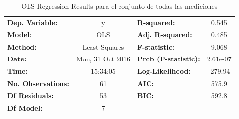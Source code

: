 \documentclass{article}
\begin{document}
\begin {table}

\begin{center}

\caption{OLS Regression Results para el conjunto de todas las mediciones}
\label{tabla:entrenamientoGlobal}

\vspace{0.3in}

\begin{tabular}{lclc}

\toprule
\textbf{Dep. Variable:}    &        y         & \textbf{  R-squared:         } &     0.545   \\
\textbf{Model:}            &       OLS        & \textbf{  Adj. R-squared:    } &     0.485   \\
\textbf{Method:}           &  Least Squares   & \textbf{  F-statistic:       } &     9.068   \\
\textbf{Date:}             & Mon, 31 Oct 2016 & \textbf{  Prob (F-statistic):} &  2.61e-07   \\
\textbf{Time:}             &     15:34:05     & \textbf{  Log-Likelihood:    } &   -279.94   \\
\textbf{No. Observations:} &          61      & \textbf{  AIC:               } &     575.9   \\
\textbf{Df Residuals:}     &          53      & \textbf{  BIC:               } &     592.8   \\
\textbf{Df Model:}         &           7      & \textbf{                     } &             \\
\bottomrule
\end{tabular}


\end{center}
\end{table}
\end{document}
